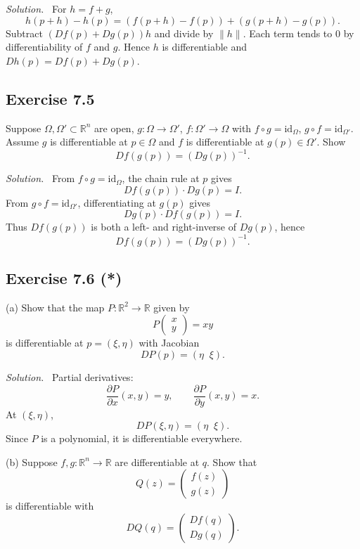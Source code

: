 \documentclass[11pt,a4paper]{article}
\newenvironment{solution}{\par\noindent\textit{Solution.}\ }{\par\vspace{0.5em}}
\begin{document}
\begin{solution}
	For $h=f+g$, 
	\[
	h(p+h)-h(p) = (f(p+h)-f(p))+(g(p+h)-g(p)).
	\]
	Subtract $(Df(p)+Dg(p))h$ and divide by $\|h\|$. Each term tends to $0$ by differentiability of $f$ and $g$.
	Hence $h$ is differentiable and $Dh(p)=Df(p)+Dg(p)$.
\end{solution}


\subsection*{Exercise 7.5}
Suppose $\Omega,\Omega'\subset\mathbb{R}^n$ are open, $g:\Omega\to\Omega'$, $f:\Omega'\to\Omega$ with $f\circ g=\mathrm{id}_\Omega$, $g\circ f=\mathrm{id}_{\Omega'}$. Assume $g$ is differentiable at $p\in\Omega$ and $f$ is differentiable at $g(p)\in\Omega'$. Show
\[
Df(g(p))=(Dg(p))^{-1}.
\]

\begin{solution}
	From $f\circ g=\mathrm{id}_\Omega$, the chain rule at $p$ gives
	\[
	Df(g(p))\cdot Dg(p)=I.
	\]
	From $g\circ f=\mathrm{id}_{\Omega'}$, differentiating at $g(p)$ gives
	\[
	Dg(p)\cdot Df(g(p))=I.
	\]
	Thus $Df(g(p))$ is both a left- and right-inverse of $Dg(p)$, hence 
	\[
	Df(g(p))=(Dg(p))^{-1}.
	\]
\end{solution}

\subsection*{Exercise 7.6 (*)}

(a) Show that the map $P:\mathbb{R}^2\to\mathbb{R}$ given by
\[
P\!\begin{pmatrix}x\\y\end{pmatrix} = xy
\]
is differentiable at $p=(\xi,\eta)$ with Jacobian
\[
DP(p)=(\eta \;\; \xi).
\]

\begin{solution}
	Partial derivatives:
	\[
	\frac{\partial P}{\partial x}(x,y)=y,\qquad \frac{\partial P}{\partial y}(x,y)=x.
	\]
	At $(\xi,\eta)$,
	\[
	DP(\xi,\eta)=(\eta\;\;\xi).
	\]
	Since $P$ is a polynomial, it is differentiable everywhere.
\end{solution}

(b) Suppose $f,g:\mathbb{R}^n\to\mathbb{R}$ are differentiable at $q$. Show that
\[
Q(z)=\begin{pmatrix}f(z)\\ g(z)\end{pmatrix}
\]
is differentiable with
\[
DQ(q)=\begin{pmatrix} Df(q) \\ Dg(q) \end{pmatrix}.
\]
\end{document}
